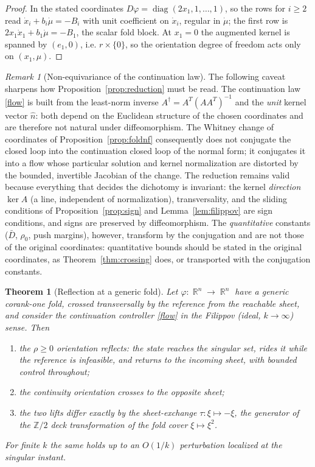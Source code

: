 \documentclass[11pt,american]{article}
\DeclareMathOperator{\R}{\mathbb{R}}
\newtheorem{theorem}{Theorem}
\theoremstyle{definition}
\theoremstyle{plain}
\theoremstyle{remark}
\newtheorem{remark}{Remark}
\begin{document}
\begin{proof}
In the stated coordinates $D\varphi=\operatorname{diag}(2x_1,1,\dots,1)$, so the rows for $i\ge2$ read $\dot x_i + b_i\dot\mu = -B_i$ with unit coefficient on $\dot x_i$, regular in $\dot\mu$; the first row is $2x_1\dot x_1 + b_1\dot\mu = -B_1$, the scalar fold block. At $x_1=0$ the augmented kernel is spanned by $(e_1,0)$, i.e. $r\times\{0\}$, so the orientation degree of freedom acts only on $(x_1,\mu)$.
\end{proof}

\begin{remark}[Non-equivariance of the continuation law]\label{rem:nonequivariance}
The following caveat sharpens how Proposition~\ref{prop:reduction} must be read. The continuation law \eqref{flow} is built from the least-norm inverse $A^\dagger=A^T(AA^T)^{-1}$ and the \emph{unit} kernel vector $\hat n$: both depend on the Euclidean structure of the chosen coordinates and are therefore not natural under diffeomorphism. The Whitney change of coordinates of Proposition~\ref{prop:foldnf} consequently does not conjugate the closed loop into the continuation closed loop of the normal form; it conjugates it into a flow whose particular solution and kernel normalization are distorted by the bounded, invertible Jacobian of the change. The reduction remains valid because everything that decides the dichotomy is invariant: the kernel \emph{direction} $\ker A$ (a line, independent of normalization), transversality, and the sliding conditions of Proposition~\ref{prop:sign} and Lemma~\ref{lem:filippov} are sign conditions, and signs are preserved by diffeomorphism. The \emph{quantitative} constants ($\bar D$, $\rho_0$, push margins), however, transform by the conjugation and are not those of the original coordinates: quantitative bounds should be stated in the original coordinates, as Theorem~\ref{thm:crossing} does, or transported with the conjugation constants.
\end{remark}

\begin{theorem}[Reflection at a generic fold]\label{thm:reflection}
Let $\varphi:\R^n\to\R^n$ have a generic corank-one fold, crossed transversally by the reference from the reachable sheet, and consider the continuation controller \eqref{flow} in the Filippov (ideal, $k\to\infty$) sense. Then
\begin{enumerate}
\item[(i)] the $\rho\ge0$ orientation reflects: the state reaches the singular set, rides it while the reference is infeasible, and returns to the incoming sheet, with bounded control throughout;
\item[(ii)] the continuity orientation crosses to the opposite sheet;
\item[(iii)] the two lifts differ exactly by the sheet-exchange $\tau:\xi\mapsto-\xi$, the generator of the $\mathbb Z/2$ deck transformation of the fold cover $\xi\mapsto\xi^2$.
\end{enumerate}
For finite $k$ the same holds up to an $O(1/k)$ perturbation localized at the singular instant.
\end{theorem}
\end{document}
